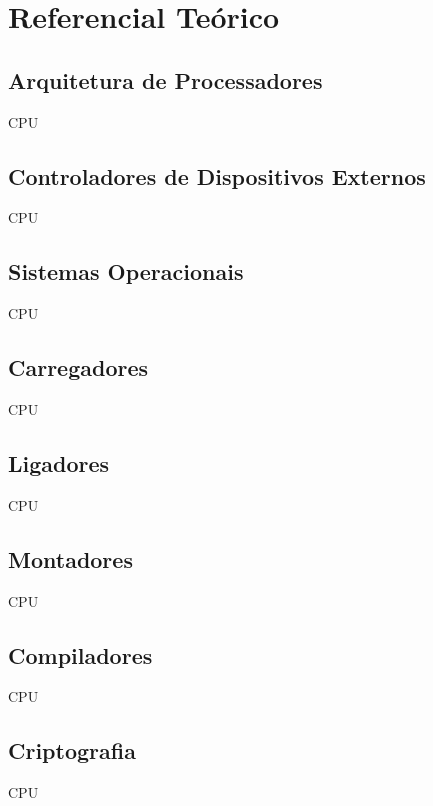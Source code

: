 
\chapter{Referencial Teórico}

\section{Arquitetura de Processadores}

CPU

\section{Controladores de Dispositivos Externos}

CPU

\section{Sistemas Operacionais}

CPU

\section{Carregadores}

CPU

\section{Ligadores}

CPU

\section{Montadores}

CPU

\section{Compiladores}

CPU

\section{Criptografia}

CPU
